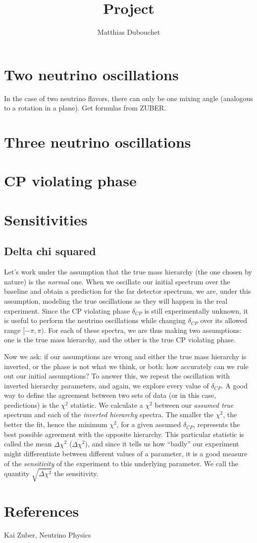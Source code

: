 \documentclass[10pt, a4paper]{article}
\title{Project}
\author{Matthias Dubouchet}
\date{}
\begin{document}
\maketitle
\section{Two neutrino oscillations}
In the case of two neutrino flavors, there can only be one mixing angle
(analogous to a rotation in a plane). Get formulas from ZUBER.


\section{Three neutrino oscillations}

\section{CP violating phase}

\section{Sensitivities}

\subsection{Delta chi squared}
Let's work under the assumption that the true mass hierarchy (the one chosen by
nature) is the \emph{normal} one. When we oscillate our initial spectrum over
the baseline and obtain a prediction for the far detector spectrum, we are,
under this assumption, modeling the true oscillations as they will happen in
the real experiment. Since the CP violating phase $\delta_{CP}$ is still
experimentally unknown, it is useful to perform the neutrino oscillations while
changing $\delta_{CP}$ over its allowed range $[-\pi,\pi)$. For each of these
spectra, we are thus making two assumptions: one is the true mass hierarchy,
and the other is the true CP violating phase.

Now we ask: if our assumptions are wrong and either the true mass hierarchy
is inverted, or the phase is not what we think, or both: how accurately can
we rule out our initial assumptions? To answer this, we repeat the oscillation
with inverted hierarchy parameters, and again, we explore every value of
$\delta_{CP}$. A good way to define the agreement between two sets of data (or
in this case, predictions) is
the $\chi^2$ statistic. We calculate a $\chi^2$ between our \emph{assumed true}
spectrum and each of the \emph{inverted hierarchy} spectra. The smaller the
$\chi^2$, the better the fit, hence the minimum $\chi^2$, for a given assumed
$\delta_{CP}$, represents the best possible agreement with the opposite
hierarchy. This particular statistic is called the mean $\Delta\chi^2$
($\overline{\Delta\chi^2}$), and since it tells us how ``badly'' our experiment
might differentiate between different values of a parameter,  it is a good
measure of the \emph{sensitivity} of the experiment to this underlying parameter.
We call the quantity $\sqrt{\overline{\Delta\chi^2}}$ the sensitivity.


\section{References}
Kai Zuber, Neutrino Physics
\end{document}
